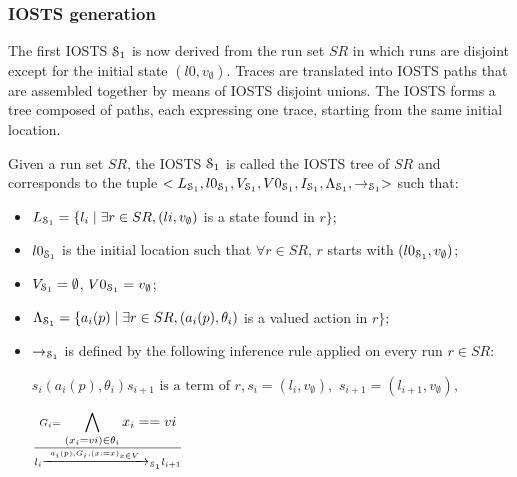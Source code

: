 
\subsubsection{IOSTS generation}
\label{sec:iosts-gen}

The first IOSTS $\EuScript{S}_1$ is now derived from the run set
$SR$ in which runs are disjoint except for the initial state
$(l0,v_\emptyset)$. Traces are translated into IOSTS paths that
are assembled together by means of IOSTS disjoint unions. The
IOSTS forms a tree composed of paths, each expressing one trace,
starting from the same initial location.

\begin{definition}
\label{IOSTS_tree}
Given a run set $SR$, the IOSTS $\EuScript{S}_1$ is called the
IOSTS tree of $SR$ and corresponds to the tuple
$<L_{\EuScript{S}_1}, l0_{\EuScript{S}_1},V_{\EuScript{S}_1},
V0_{\EuScript{S}_1}, I_{\EuScript{S}_1},
\Lambda_{\EuScript{S}_1},\rightarrow_{\EuScript{S}_1}>$ such
that:

\begin{itemize}

\item $L_{\EuScript{S}_1}= \{l_i \mid \exists r\in SR, (li,v_\emptyset)$ is
a state found in $r\}$;

\item $l0_{\EuScript{S}_1}$ is the initial location such that $\forall r \in
SR$, $r$ starts with $(l0_{\EuScript{S}_1},v_\emptyset)$;

\item $V_{\EuScript{S}_1}=\emptyset$,
    $V0_{\EuScript{S}_1}=v_\emptyset$;

\item $\Lambda_{\EuScript{S}_1}= \{a_i(p) \mid \exists r\in SR,
(a_i(p),\theta_i)$ is a valued action in $r\}$;

\item $\rightarrow_{\EuScript{S}_1}$ is defined by the following
    inference rule applied on every run $r\in SR$:

    $s_i (a_i(p),\theta_i) s_{i+1} \text{ is a term of } r,
    s_i=(l_i,v_\emptyset),$ $s_{i+1}=(l_{i+1},v_\emptyset),$

    \begin{center}
    {\Large
        $\frac{G_i=\displaystyle \bigwedge_{(x_i=vi)\in \theta_i} x_i==vi}
        {l_i \xrightarrow{a_i(p),G_i,(x:=x)_{x\in V}}_{\EuScript{S}_1} l_{i+1}}$
    }
    \end{center}

\end{itemize}
\end{definition}

